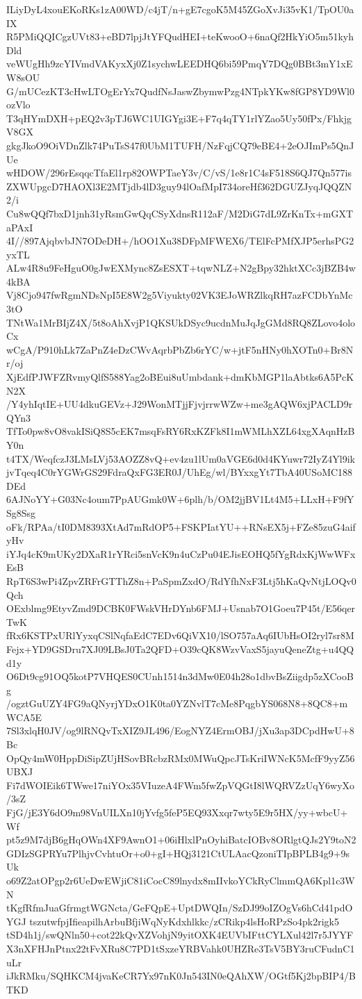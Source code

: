 ILiyDyL4xouEKoRKs1zA00WD/c4jT/n+gE7cgoK5M45ZGoXvJi35vK1/TpOU0aIX
R5PMiQQICgzUVt83+eBD7lpjJtYFQudHEI+teKwooO+6naQf2HkYiO5m51kyhDld
veWUgHh9zcYIVmdVAKyxXj0Z1sychwLEEDHQ6bi59PmqY7DQg0BBt3mY1xEW8sOU
G/mUCezKT3cHwLTOgErYx7QudfNsJaswZbymwPzg4NTpkYKw8fGP8YD9Wl0ozVlo
T3qHYmDXH+pEQ2v3pTJ6WC1UIGYgi3E+F7q4qTY1rlYZao5Uy50fPx/FhkjgV8GX
gkgJkoO9OiVDnZlk74PuTsS47f0UbM1TUFH/NzFqjCQ79eBE4+2eOJImPs5QnJUe
wHDOW/296rEsqqcTfaEl1rp82OWPTaeY3v/C/vS/1e8r1C4sF518S6QJ7Qn577is
ZXWUpgcD7HAOXl3E2MTjdb4lD3guy94lOafMpI734oreHf362DGUZJyqJQQZN2/i
Cu8wQQf7bxD1jnh31yRsmGwQqCSyXdnsR112aF/M2DiG7dL9ZrKnTx+mGXTaPAxI
4I//897AjqbvbJN7ODeDH+/hOO1Xu38DFpMFWEX6/TElFcPMfXJP5erhsPG2yxTL
ALw4R8u9FeHguO0gJwEXMync8ZsESXT+tqwNLZ+N2gBpy32hktXCc3jBZB4w4kBA
Vj8Cjo947fwRgmNDsNpI5E8W2g5Viyukty02VK3EJoWRZlkqRH7azFCDbYnMc3tO
TNtWa1MrBIjZ4X/5t8oAhXvjP1QKSUkDSyc9ucdnMuJqJgGMd8RQ8ZLovo4oloCx
wCgA/P910hLk7ZaPnZ4eDzCWvAqrbPbZb6rYC/w+jtF5nHNy0hXOTn0+Br8Nr/oj
XjEdfPJWFZRvmyQlfS588Yag2oBEui8uUmbdank+dmKbMGP1laAbtks6A5PcKN2X
/Y4yhIqtIE+UU4dkuGEVz+J29WonMTjjFjvjrrwWZw+me3gAQW6xjPACLD9rQYn3
TfTo0pw8vO8vakISiQ8S5cEK7msqFsRY6RxKZFk8I1mWMLhXZL64xgXAqnHzBY0n
t4TX/WeqfczJ3LMsLVj53AOZZ8vQ+ev4zu1lUm0aVGE6d0d4KYuwr72IyZ4Yl9ik
jvTqeq4C0rYGWrGS29FdraQxFG3ER0J/UhEg/wl/BYxxgYt7TbA40USoMC188DEd
6AJNoYY+G03Nc4oum7PpAUGmk0W+6plh/b/OM2jjBV1Lt4M5+LLxH+F9fYSg8Ssg
oFk/RPAa/tI0DM8393XtAd7mRdOP5+FSKPIatYU++RNsEX5j+FZe85zuG4aifyHv
iYJq4cK9mUKy2DXaR1rYRci5snVcK9n4uCzPu04EJisEOHQ5fYgRdxKjWwWFxEsB
RpT6S3wPi4ZpvZRFrGTThZ8n+PaSpmZxdO/RdYfhNxF3Ltj5hKaQvNtjLOQv0Qch
OExblmg9EtyvZmd9DCBK0FWskVHrDYnb6FMJ+Usnab7O1Goeu7P45t/E56qerTwK
fRx6KSTPxURlYyxqCSlNqfaEdC7EDv6QiVX10/lSO757aAq6IUbHsOI2ryl7sr8M
Fejx+YD9GSDru7XJ09LBsJ0Ta2QFD+O39cQK8WzvVaxS5jayuQeneZtg+u4QQd1y
O6Dt9cg91OQ5kotP7VHQES0CUnh1514n3dMw0E04h28o1dbvBsZiigdp5zXCooBg
/ogztGuUZY4FG9aQNyrjYDxO1K0ta0YZNvlT7cMe8PqgbYS068N8+8QC8+mWCA5E
7Sl3xlqH0JV/og9lRNQvTxXIZ9JL496/EogNYZ4ErmOBJ/jXu3ap3DCpdHwU+8Bc
OpQy4mW0HppDiSipZUjHSovBRcbzRMx0MWuQpcJTsKriIWNcK5McfF9yyZ56UBXJ
Fi7dWOIEik6TWwe17niYOx35VIuzeA4FWm5fwZpVQGtI8lWQRVZzUqY6wyXo/3sZ
FjG/jE3Y6dO9m98VnUILXn10jYvfg5feP5EQ93Xxqr7wty5E9r5HX/yy+wbcU+Wf
pt5z9M7djB6gHqOWn4XF9AwnO1+06iHlxlPnOyhiBatcIOBv8ORlgtQJs2Y9toN2
GDIzSGPRYu7PlhjvCvhtuOr+o0+gI+HQj3121CtULAacQzoniTIpBPLB4g9+9sUk
o69Z2atOPgp2r6UeDwEWjiC81iCocC89lnydx8mIIvkoYCkRyClmmQA6Kpl1c3WN
tKgfRfmJuaGfrmgtWGNcta/GeFQpE+UptDWQIn/SzDJ99oIZOgVs6hCd41pdOYGJ
tszutwfpjIfieapilhArbuBfjiWqNyKdxhlkkc/zCRikp4lsHoRPzSo4pk2rigk5
tSD4h1j/swQNln50+cot22kQvXZVohjN9yitOXK4EUVbIFttCYLXul42l7r5JYYF
X3nXFHJnPtnx22tFvXRu8C7PD1tSxzeYRBVahk0UHZRe3TsV5BY3ruCFudnC1uLr
iJkRMku/SQHKCM4jvaKeCR7Yx97nK0Jn543IN0eQAhXW/OGtf5Kj2bpBIP4/BTKD
